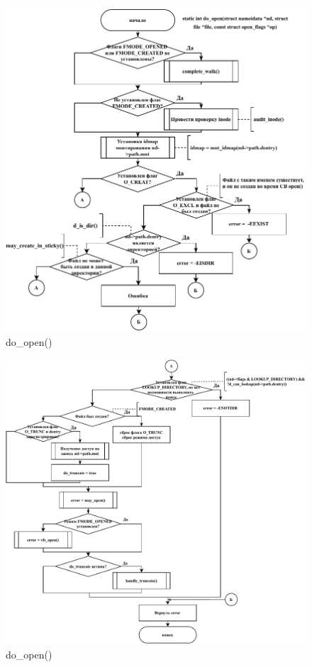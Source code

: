 \begin{figure}[ht]
	\centering
	\includegraphics[width=\textwidth]{img/do_open.pdf}
	\caption{do\_open()}
\end{figure}

\begin{figure}[ht]
	\centering
	\includegraphics[width=\textwidth]{img/do_open2.pdf}
	\caption{do\_open()}
\end{figure}
